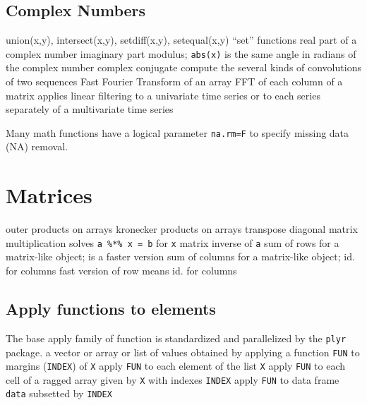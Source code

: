 {\subsection{Complex Numbers}{{\smalltt union(x,y),  intersect(x,y),  setdiff(x,y),  setequal(x,y)}}
	{``set'' functions}
	{real part of a complex number}
	{imaginary part}
	{modulus; {\tt abs(x)} is the same}
	{angle in radians of the complex number}
	{complex conjugate}
	{compute the several kinds of convolutions of two sequences}
	{Fast Fourier Transform of an array}
	{FFT of each column of a matrix}
	{applies linear filtering to a univariate time series or to each series separately of a multivariate time series}

Many math functions have a logical parameter {\tt na.rm=F} to
specify missing data (NA) removal.

\section{Matrices}{}

	{outer products on arrays}
	{kronecker products on arrays}
	{transpose}
	{diagonal}
\cmdS{\%*\%}	{matrix multiplication}
	{solves {\tt a \%*\% x = b} for {\tt x}}
	{matrix inverse of {\tt a}}
	{sum of rows for a matrix-like object;}
	{is a faster version}
	{sum of columns for a matrix-like object;}
	{id. for columns}
	{fast version of row means}
	{id. for columns}

\subsection{Apply functions to elements}{The base apply family of function is
    standardized and parallelized by the {\tt plyr} package.}
	{a vector or array or list of values obtained by applying a function {\tt FUN} to margins ({\tt INDEX}) of {\tt X}}
	{apply {\tt FUN} to each element of the list {\tt X}}
	{apply {\tt FUN} to each cell of a ragged array given by {\tt X} with indexes {\tt INDEX}}
	{apply {\tt FUN} to data frame {\tt data} subsetted by {\tt INDEX}}

}
